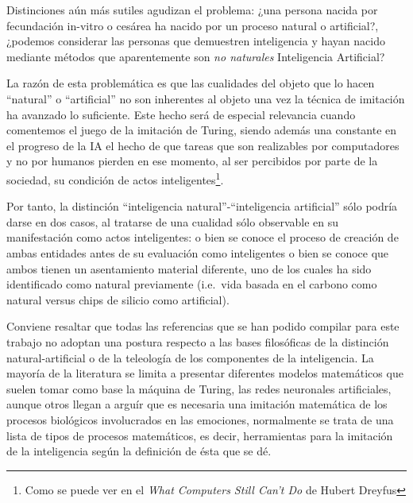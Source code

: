 \documentclass[12pt]{memoir}
\begin{document}
Distinciones aún más sutiles agudizan el problema: ¿una persona nacida por fecundación in-vitro o cesárea ha nacido por un proceso natural o artificial?, ¿podemos considerar las personas que demuestren inteligencia y hayan nacido mediante métodos que aparentemente son \textit{no naturales} Inteligencia Artificial?

La razón de esta problemática es que las cualidades del objeto que lo hacen ``natural'' o ``artificial'' no son inherentes al objeto una vez la técnica de imitación ha avanzado lo suficiente. Este hecho será de especial relevancia cuando comentemos el juego de la imitación de Turing, siendo además una constante en el progreso de la IA el hecho de que tareas que son realizables por computadores y no por humanos pierden en ese momento, al ser percibidos por parte de la sociedad, su condición de actos inteligentes\footnote{Como se puede ver en el \textit{What Computers Still Can't Do} de Hubert Dreyfus}.

Por tanto, la distinción ``inteligencia natural''-``inteligencia artificial'' sólo podría darse en dos casos, al tratarse de una cualidad sólo observable en su manifestación como actos inteligentes: o bien se conoce el proceso de creación de ambas entidades antes de su evaluación como inteligentes o bien se conoce que ambos tienen un asentamiento material diferente, uno de los cuales ha sido identificado como natural previamente (i.e.\ vida basada en el carbono como natural versus chips de silicio como artificial).

Conviene resaltar que todas las referencias que se han podido compilar para este trabajo no adoptan una postura respecto a las bases filosóficas de la distinción natural-artificial o de la teleología de los componentes de la inteligencia. La mayoría de la literatura se limita a presentar diferentes modelos matemáticos que suelen tomar como base la máquina de Turing, las redes neuronales artificiales, aunque otros llegan a arguír que es necesaria una imitación matemática de los procesos biológicos involucrados en las emociones, normalmente se trata de una lista de tipos de procesos matemáticos, es decir, herramientas para la imitación de la inteligencia según la definición de ésta que se dé.
\end{document}
